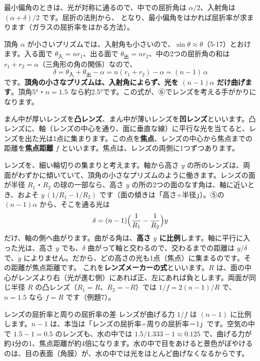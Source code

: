 \noindent 最小偏角のときは、光が対称に通るので、中での屈折角は $\alpha/2$、入射角は $(\alpha+\delta)/2$ です。屈折の法則から、
となり、最小偏角をはかれば屈折率が求まります（ガラスの屈折率をはかる方法）。

頂角 $\alpha$ が小さいプリズムでは、入射角も小さいので、$\sin\theta\approx\theta$（5-17）とおけます。入る面で $\theta_{\text{入}}=nr_1$、出る面で $\theta_{\text{出}}=nr_2$、中の2つの屈折角の和は $r_1+r_2=\alpha$（三角形の角の関係）なので、
\[\delta=\theta_{\text{入}}+\theta_{\text{出}}-\alpha=n(r_1+r_2)-\alpha=(n-1)\,\alpha\]
です。\textbf{頂角の小さなプリズムは、入射角によらず、光を $(n-1)\alpha$ だけ曲げます}。頂角\ang{5}・$n=1.5$ なら約\ang{2.5}です。この式が、⑥でレンズを考える手がかりになります。

\label{ph:波-12:sec6}
\label{ph:波-12:zou}まん中が厚いレンズを\textbf{凸レンズ}、まん中が薄いレンズを\textbf{凹レンズ}といいます。凸レンズに、軸（レンズの中心を通り、面に垂直な線）に平行な光を当てると、レンズを出た光は1点に集まります。この点を\textbf{焦点}、レンズの中心から焦点までの距離を\textbf{焦点距離} $f$ といいます。焦点は、レンズの両側に1つずつあります。

レンズを、細い輪切りの集まりと考えます。軸から高さ $y$ の所のレンズは、両面がわずかに傾いていて、頂角の小さなプリズムのように働きます。レンズの面が半径 $R_1$・$R_2$ の球の一部なら、高さ $y$ の所の2つの面のなす角は、軸に近いとき、およそ $y\,(1/R_1-1/R_2)$ です（面の傾きは「高さ÷半径」）。⑤の $(n-1)\alpha$ から、そこを通る光は
\[\delta=(n-1)\Bigl(\frac{1}{R_1}-\frac{1}{R_2}\Bigr)y\]
だけ、軸の側へ曲がります。曲がる角は、\textbf{高さ $y$ に比例}します。軸に平行に入った光は、高さ $y$ でも、$\delta$ 曲がって軸と交わるので、交わるまでの距離は $y/\delta$ で、$y$ によりません。だから、どの高さの光も1点（焦点）に集まるのです。その距離が焦点距離です。
これを\textbf{レンズメーカーの式}といいます。$R$ は、面の中心がレンズより右（光が進む側）にあれば正、左にあれば負とします。両面が同じ半径 $R$ の凸レンズ（$R_1=R$、$R_2=-R$）では $1/f=2(n-1)/R$ で、$n=1.5$ なら $f=R$ です（例題7）。

\begin{phbaisuru}{レンズの屈折率と周りの屈折率の差}
レンズが曲げる力 $1/f$ は $(n-1)$ に比例します。$n-1$ は、本当は「レンズの屈折率÷周りの屈折率－1」です。空気の中で $1.5-1=0.5$ のレンズも、水の中では $1.5/1.333-1\approx0.125$ で、曲げる力が約4分の1、焦点距離が約4倍になります。水の中で目をあけると景色がぼやけるのは、目の表面（角膜）が、水の中では光をほとんど曲げなくなるからです。
\end{phbaisuru}

